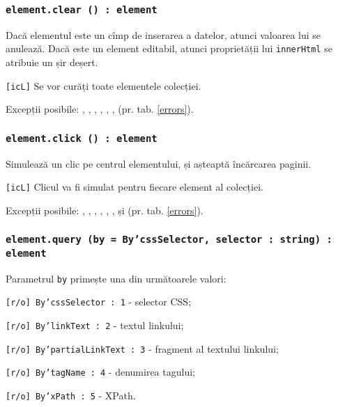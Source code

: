 \subsubsection{\texttt{element.clear () : element}}

Dacă elementul este un cîmp de inserarea a datelor, atunci valoarea lui se anulează. Dacă este un element editabil, atunci proprietății lui \texttt{innerHtml} se atribuie un șir deșert.

\texttt{[icL]} Se vor curăți toate elementele colecției.

Excepții posibile: , , , , , ,  (pr. tab. \ref{errors}).

\subsubsection{\texttt{element.click () : element}}

Simulează un clic pe centrul elementului, și așteaptă încărcarea paginii.

\texttt{[icL]} Clicul va fi simulat pentru fiecare element al colecției.

Excepții posibile: , , , , , ,  și  (pr. tab. \ref{errors}).

\subsubsection{\texttt{element.query (by = By'cssSelector, selector : string) : element}}

Parametrul \texttt{by} primește una din următoarele valori:
\begin{icItems}
    \item \texttt{[r/o] By'cssSelector : 1} - selector CSS;
	\item \texttt{[r/o] By'linkText : 2} - textul linkului;
	\item \texttt{[r/o] By'partialLinkText : 3} - fragment al textului linkului;
	\item \texttt{[r/o] By'tagName : 4} - denumirea tagului;
	\item \texttt{[r/o] By'xPath : 5} - XPath.
\end{icItems}

